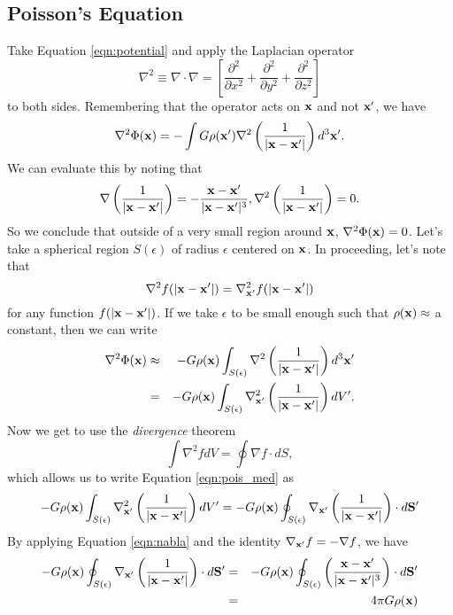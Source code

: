 \documentclass[]{article}
\begin{document}
\subsection{Poisson's Equation}

Take Equation \ref{eqn:potential} and apply the Laplacian operator 
\begin{equation}
\nabla^{2} \equiv \nabla \cdot \nabla = \left[\frac{\partial^{2}}{\partial x^{2}}+\frac{\partial^{2}}{\partial y^{2}}+\frac{\partial^{2}}{\partial z^{2}}\right]
\end{equation}
\noindent
to both sides.  Remembering that the operator acts on $\mathbf{x}$ and not $\mathbf{x}'$, we have
\begin{equation}
\label{eqn:pois_init}
\nabla^{2} \Phi(\mathbf{x}) = - \int G \rho(\mathbf{x}') \nabla^{2} \left(\frac{1}{|\mathbf{x}-\mathbf{x}'|}\right)d^{3}\mathbf{x}'.
\end{equation}
\noindent
We can evaluate this by noting that
\begin{equation}
\label{eqn:nabla}
\nabla\left(\frac{1}{|\mathbf{x} - \mathbf{x}'|}\right) = -\frac{\mathbf{x}-\mathbf{x}'}{|\mathbf{x}-\mathbf{x}'|^3}, \nabla^{2}\left(\frac{1}{|\mathbf{x} - \mathbf{x}'|}\right) = 0.
\end{equation}
\noindent
So we conclude that outside of a very small region around $\mathbf{x}$, $\nabla^{2}\Phi(\mathbf{x})=0$.
Let's take a spherical region $S(\epsilon)$ of radius $\epsilon$ centered on $\mathbf{x}$. In proceeding, let's 
note that 
\begin{equation}
\nabla^{2} f(|\mathbf{x}-\mathbf{x}'|) = \nabla_{\mathbf{x}'}^{2} f(|\mathbf{x}-\mathbf{x}'|)
\end{equation}
\noindent
for any function $f(|\mathbf{x} - \mathbf{x}'|)$. If we take $\epsilon$ to be small enough such 
that $\rho(\mathbf{x})\approx$ a constant, then we can write
\begin{eqnarray}
\label{eqn:pois_med}
\nabla^{2}\Phi(\mathbf{x}) &\approx& - G\rho(\mathbf{x}) \int_{S(\epsilon)} \nabla^2 \left( \frac{1}{|\mathbf{x} - \mathbf{x}'|} \right)d^{3}\mathbf{x}' \nonumber \\
&=& - G \rho(\mathbf{x})  \int_{S(\epsilon)} \nabla_{\mathbf{x}'}^2 \left( \frac{1}{|\mathbf{x} - \mathbf{x}'|} \right)d V'.
\end{eqnarray}
\noindent
Now we get to use the {\it divergence} theorem
\begin{equation}
\int \nabla^{2} f dV = \oint \nabla f \cdot dS,
\end{equation}
\noindent
which allows us to write Equation \ref{eqn:pois_med} as
\begin{equation}
- G \rho(\mathbf{x})  \int_{S(\epsilon)} \nabla_{\mathbf{x}'}^2 \left( \frac{1}{|\mathbf{x} - \mathbf{x}'|} \right)d V' = - G \rho(\mathbf{x}) \oint_{S(\epsilon)} \nabla_{\mathbf{x}'}\left(\frac{1}{|\mathbf{x}-\mathbf{x}'|}\right) \cdot d\mathbf{S}'
\end{equation}
\noindent
By applying Equation \ref{eqn:nabla} and the identity $\nabla_{\mathbf{x}'} f = -\nabla f$, we have
\begin{eqnarray}
- G \rho(\mathbf{x}) \oint_{S(\epsilon)} \nabla_{\mathbf{x}'}\left(\frac{1}{|\mathbf{x}-\mathbf{x}'|}\right) \cdot d\mathbf{S}' &=&
-G \rho(\mathbf{x}) \oint_{S(\epsilon)} \left(\frac{\mathbf{x}-\mathbf{x}'}{|\mathbf{x}-\mathbf{x}'|^{3}}\right) \cdot d\mathbf{S}' \nonumber \\
&=& 4 \pi G \rho(\mathbf{x})
\end{eqnarray}
\end{document}
